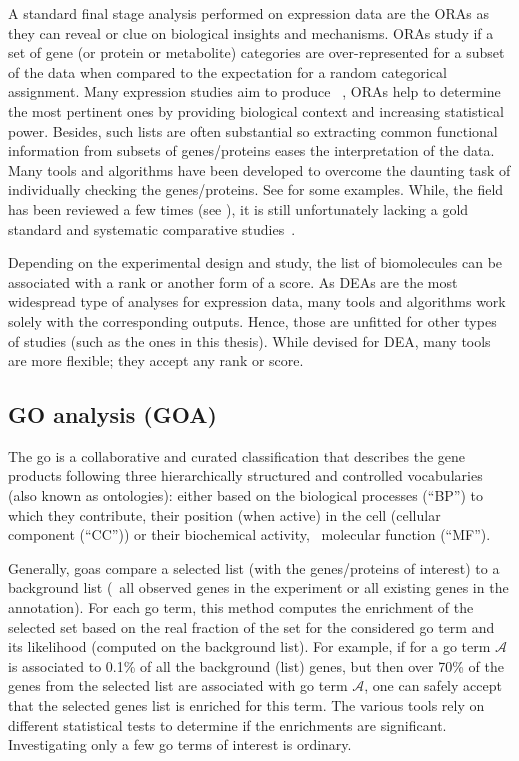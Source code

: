 A standard final stage analysis performed on expression data are the \glspl{ORA}
as they can reveal or clue on biological insights and mechanisms.
\glspl{ORA} study if a set of gene (or protein or metabolite) categories
are over-represented for a subset of the data
when compared to the expectation for a random categorical assignment.
Many expression studies aim to produce ~,
\glspl{ORA} help to determine the most pertinent ones
by providing biological context and increasing statistical power.
Besides, such lists are often substantial
so extracting common functional information from subsets of genes/proteins eases
the interpretation of the data.
Many tools and algorithms have been developed
to overcome the daunting task of individually checking the genes/proteins.
See \citet{Shi_Jing2015-yh} for some examples.
While, the field has been reviewed a few times
(see \citet{Khatri2005-su,Huang2009-zk,Khatri2012-ki}),
it is still unfortunately lacking a gold standard
and systematic comparative studies~.

Depending on the experimental design and study,
the list of biomolecules can be associated with a rank or another form of a score.
As \glspl{DEA} are the most widespread type of analyses for expression data,
many tools and algorithms work solely with the corresponding outputs.
Hence, those are unfitted for other types of studies
(such as the ones in this thesis).
While devised for \gls{DEA}, many tools are more flexible;
they accept any rank or score.

\subsection{GO analysis (GOA)}
The \gls{go} is a collaborative and curated classification
that describes the gene products
following three hierarchically structured and controlled vocabularies
(also known as ontologies):
either based on the biological processes (\enquote{BP}) to which they contribute,
their position (when active) in the cell (cellular component (\enquote{CC})) or
their biochemical activity, \ie\ molecular function (\enquote{MF}).~

Generally, \glspl{goa} compare a selected list (with the genes/proteins of interest)
to a background list
(\eg\ all observed genes in the experiment or all existing genes in the annotation).
For each \gls{go} term,
this method computes the enrichment of the selected set based on
the real fraction of the set for the considered \gls{go} term and its likelihood
(computed on the background list).
For example, if for a \gls{go} term $\mathcal{A}$ is associated to 0.1\%
of all the background (list) genes,
but then over 70\% of the genes from the selected list are associated
with \gls{go} term $\mathcal{A}$,
one can safely accept that the selected genes list is enriched for this term.
The various tools rely on different statistical tests to determine
if the enrichments are significant.
Investigating only a few \gls{go} terms of interest is ordinary.

